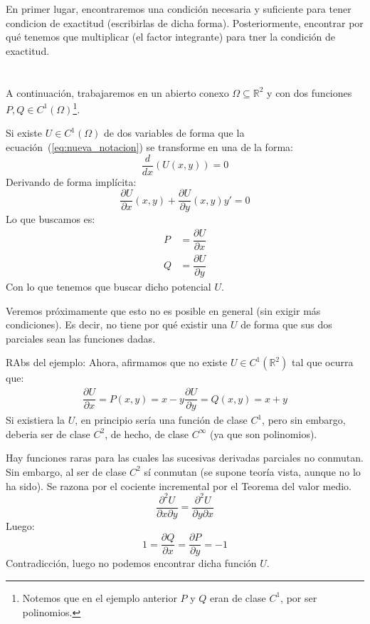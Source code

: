 En primer lugar, encontraremos una condición necesaria y suficiente para tener condicion de exactitud (escribirlas de dicha forma).
Posteriormente, encontrar por qué tenemos que multiplicar (el factor integrante) para tner la condición de exactitud.

\section{} %
A continuación, trabajaremos en un abierto conexo $\Omega\subseteq \mathbb{R}^2$ y con dos funciones $P,Q\in C^1(\Omega)$\footnote{Notemos que en el ejemplo anterior $P$ y $Q$ eran de clase $C^1$, por ser polinomios.}.

Si existe $U\in C^1(\Omega)$ de dos variables de forma que la ecuación~(\ref{eq:nueva_notacion}) se transforme en una de la forma:
\begin{equation*}
    \dfrac{d}{dx}(U(x,y)) = 0
\end{equation*}
Derivando de forma implícita:
\begin{equation*}
    \dfrac{\partial U}{\partial x}(x,y) + \dfrac{\partial U}{\partial y}(x,y)y' = 0
\end{equation*}
Lo que buscamos es:
\begin{align*}
    P &= \dfrac{\partial U}{\partial x} \\
    Q &= \dfrac{\partial U}{\partial y}
\end{align*}
Con lo que tenemos que buscar dicho potencial $U$.

Veremos próximamente que esto no es posible en general (sin exigir más condiciones).
Es decir, no tiene por qué existir una $U$ de forma que sus dos parciales sean las funciones dadas.


RAbs del ejemplo:
Ahora, afirmamos que no existe $U\in C^1(\mathbb{R}^2)$ tal que ocurra que:
\begin{gather*}
    \dfrac{\partial U}{\partial x} = P(x,y) = x-y
    \dfrac{\partial U}{\partial y} = Q(x,y) = x+y
\end{gather*}
Si existiera la $U$, en principio sería una función de clase $C^1$, pero sin embargo, deberia ser de clase $C^2$, de hecho, de clase $C^\infty$ (ya que son polinomios).

Hay funciones raras para las cuales las sucesivas derivadas parciales no conmutan. Sin embargo, al ser de clase $C^2$ sí conmutan (se supone teoría vista, aunque no lo ha sido).
Se razona por el cociente incremental por el Teorema del valor medio.
\begin{equation*}
    \dfrac{\partial^2 U}{\partial x\partial y} = \dfrac{\partial^2 U}{\partial y\partial x} 
\end{equation*}
Luego:
\begin{equation*}
    1 = \dfrac{\partial Q}{\partial x} = \dfrac{\partial P}{\partial y} = -1
\end{equation*}
Contradicción, luego no podemos encontrar dicha función $U$.

